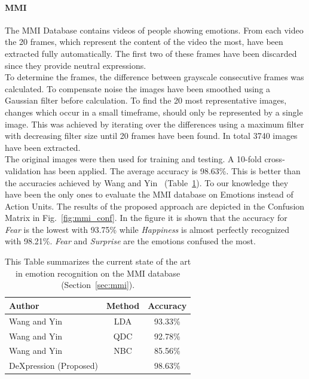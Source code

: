 \paraV
\paragraph{\textbf{MMI}}
The MMI Database contains videos of people showing emotions. From each video the 20 frames, which represent the content of the video the most, have been extracted fully automatically. The first two of these frames have been discarded since they provide neutral expressions. \\
To determine the frames, the difference between grayscale consecutive frames was calculated. To compensate noise the images have been smoothed using a Gaussian filter before calculation. To find the 20 most representative images, changes which occur in a small timeframe, should only be represented by a single image. This was achieved by iterating over the differences using a maximum filter with decreasing filter size until 20 frames have been found. In total 3740 images have been extracted.\\
The original images were then used for training and testing. A 10-fold cross-validation has been applied. The average accuracy is 98.63\%. This is better than the accuracies achieved by Wang and Yin~\cite{Wang:2007:STM:1287852.1288093} (Table~\ref{tab:mmi_results}). To our knowledge they have been the only ones to evaluate the MMI database on Emotions instead of Action Units. The results of the proposed approach are depicted in the Confusion Matrix in Fig.~\ref{fig:mmi_conf}. In the figure it is shown that the accuracy for \textit{Fear} is the lowest with 93.75\% while \textit{Happiness} is almost perfectly recognized with 98.21\%. \textit{Fear} and \textit{Surprise} are the emotions confused the most. 

\begin{table}[!ht]
\caption{This Table summarizes the current state of the art in emotion recognition on the MMI database (Section~\ref{sec:mmi}).}
\label{tab:mmi_results}
\centering
\begin{tabular}{l|c|c}
\hline
Author & Method & Accuracy \\
\hline
Wang and Yin~\cite{Wang:2007:STM:1287852.1288093} & LDA & 93.33\%\\
Wang and Yin~\cite{Wang:2007:STM:1287852.1288093} & QDC & 92.78\%\\
Wang and Yin~\cite{Wang:2007:STM:1287852.1288093} & NBC & 85.56\%\\
\hline
DeXpression (Proposed) & &98.63\% \\
\hline
\end{tabular}

\end{table}
